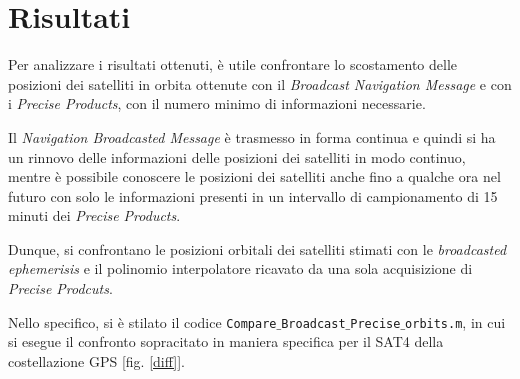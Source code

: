 \documentclass[a4paper,11pt,twoside]{book}
\begin{document}
	\clearpage
	
	\section{Risultati}
	
	Per analizzare i risultati ottenuti, è utile confrontare lo scostamento delle posizioni dei satelliti in orbita ottenute con il \textit{Broadcast Navigation Message} e con i \textit{Precise Products}, con il numero minimo di informazioni necessarie.
	
	Il \textit{Navigation Broadcasted Message} è trasmesso in forma continua e quindi si ha un rinnovo delle informazioni delle posizioni dei satelliti in modo continuo, mentre è possibile conoscere le posizioni dei satelliti anche fino a qualche ora nel futuro con solo le informazioni presenti in un intervallo di campionamento di 15 minuti dei \textit{Precise Products}.
	
	Dunque, si confrontano le posizioni orbitali dei satelliti stimati con le \textit{broadcasted ephemerisis} e il polinomio interpolatore ricavato da una sola acquisizione di \textit{Precise Prodcuts}.
	
	Nello specifico, si è stilato il codice \texttt{Compare$\_$Broadcast$\_$Precise$\_$orbits.m}, in cui si esegue il confronto sopracitato in maniera specifica per il SAT4 della costellazione GPS [fig. \ref{diff}].
	
\end{document}

